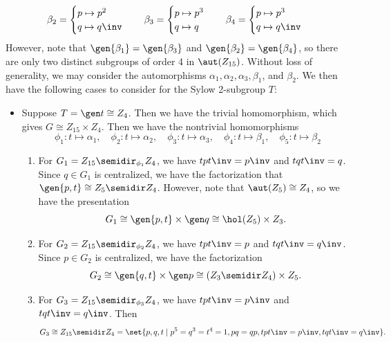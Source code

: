 \begin{solenum}
\[        \beta_2 =
        \begin{cases}
            p \mapsto p^2 \\
            q \mapsto q\inv
        \end{cases} \quad
        \beta_3 =
        \begin{cases}
            p \mapsto p^3 \\
            q \mapsto q
        \end{cases} \quad
        \beta_4 =
        \begin{cases}
            p \mapsto p^3 \\
            q \mapsto q\inv
        \end{cases}
	\]
    However, note that $\gen{\beta_1} = \gen{\beta_3}$ and $\gen{\beta_2} = \gen{\beta_4}$, so there are only two distinct subgroups of order 4 in $\aut(Z_{15})$.
	Without loss of generality, we may consider the automorphisms $\alpha_1, \alpha_2, \alpha_3, \beta_1$, and $\beta_2$.
	We then have the following cases to consider for the Sylow 2-subgroup $T$:
    \begin{itemize}
        \item Suppose $T = \gen t \cong Z_4$.
	Then we have the trivial homomorphism, which gives $G \cong Z_{15} \times Z_4$.
	Then we have the nontrivial homomorphisms
        \[
        	\phi_1 \colon t \mapsto \alpha_1, \quad \phi_2 \colon t \mapsto \alpha_2, \quad \phi_3 \colon t \mapsto \alpha_3, \quad \phi_4 \colon t \mapsto \beta_1, \quad \phi_5 \colon t \mapsto \beta_2
        \]
        \begin{enumerate}
            \item For $G_1 = Z_{15} \semidir_{\phi_1} Z_4$, we have $tpt\inv = p\inv$ and $tqt\inv = q$.
	Since $q \in G_1$ is centralized, we have the factorization that $\gen{p, t} \cong Z_5 \semidir Z_4$.
	However, note that $\aut(Z_5) \cong Z_4$, so we have the presentation
            \[
            	G_1 \cong \gen{p, t} \times \gen q \cong \hol(Z_5) \times Z_3.
            \]
            \item For $G_2 = Z_{15} \semidir_{\phi_2} Z_4$, we have $tpt\inv = p$ and $tqt\inv = q\inv$.
	Since $p \in G_2$ is centralized, we have the factorization
            \[
            	G_2 \cong \gen{q, t} \times \gen p \cong (Z_3 \semidir Z_4) \times Z_5.
            \]
            \item For $G_3 = Z_{15} \semidir_{\phi_3} Z_4$, we have $tpt\inv = p\inv$ and $tqt\inv = q\inv$.
	Then
            \[
            	G_3 \cong Z_{15} \semidir Z_4 = \set{p, q, t \mid p^5 = q^3 = t^4 = 1, pq = qp, tpt\inv = p\inv, tqt\inv = q\inv}.
\]
\end{enumerate}
\end{itemize}
\end{solenum}
